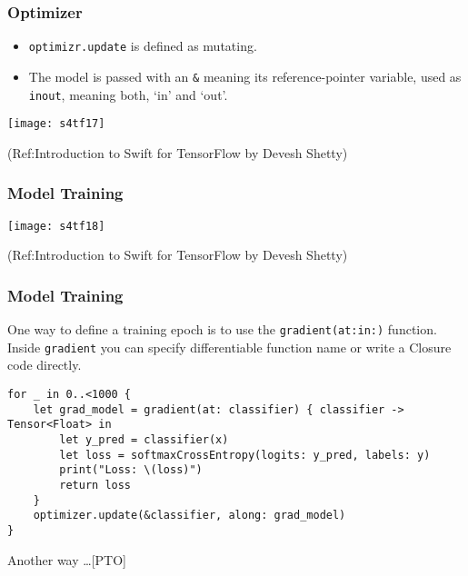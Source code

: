 \begin{frame}[fragile] \frametitle{Optimizer}

\begin{itemize}
\item  \lstinline|optimizr.update| is defined as mutating.
\item The model is passed with an \lstinline|&| meaning its reference-pointer variable, used as \lstinline|inout|, meaning both, `in' and `out'.
\end{itemize}

\begin{center}
\texttt{[image: s4tf17]}
\end{center}


{\tiny (Ref:Introduction to Swift for TensorFlow by Devesh Shetty)}

\end{frame}

\begin{frame}[fragile] \frametitle{Model Training}

\begin{center}
\texttt{[image: s4tf18]}
\end{center}


{\tiny (Ref:Introduction to Swift for TensorFlow by Devesh Shetty)}

\end{frame}

\begin{frame}[fragile] \frametitle{Model Training}

One way to define a training epoch is to use the \lstinline|gradient(at:in:)| function. Inside \lstinline|gradient| you can specify differentiable function name or write a Closure code directly.

\begin{lstlisting}[basicstyle=\scriptsize]
for _ in 0..<1000 {
    let grad_model = gradient(at: classifier) { classifier -> Tensor<Float> in
        let y_pred = classifier(x)
        let loss = softmaxCrossEntropy(logits: y_pred, labels: y)
        print("Loss: \(loss)")
        return loss
    }
    optimizer.update(&classifier, along: grad_model)
}
\end{lstlisting}



Another way \ldots [PTO]

\end{frame}

